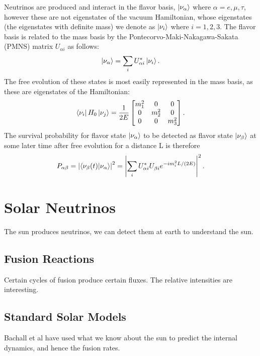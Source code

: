 Neutrinos are produced and interact in the flavor basis, $\ket{\nu_{\alpha}}$ where $\alpha = {e,\mu,\tau}$, however these are not eigenstates of the vacuum Hamiltonian, whose eigenstates (the eigenstates with definite mass) we denote as $\ket{\nu_i}$ where $i = {1,2,3}$. 
The flavor basis is related to the mass basis by the Pontecorvo-Maki-Nakagawa-Sakata (PMNS) matrix $U_{\alpha i}$ as follows:
\begin{equation}
\ket{\nu_{\alpha}} = \sum_i U^*_{\alpha i} \ket{\nu_i}.
\end{equation}
The free evolution of these states is most easily represented in the mass basis, as these are eigenstates of the Hamiltonian:
\begin{equation}
\bra{\nu_i}H_{0}\ket{\nu_j} = \frac{1}{2E}\begin{bmatrix}
m_1^2 & 0 & 0 \\
0 & m_2^2 & 0 \\
0 & 0 & m_3^2
\end{bmatrix}.
\end{equation}
The survival probability for flavor state $\ket{\nu_\alpha}$ to be detected as flavor state $\ket{\nu_\beta}$ at some later time after free evolution for a distance L is therefore
\begin{equation}
P_{\alpha\beta} = \left|\braket{\nu_\beta(t)}{\nu_\alpha}\right|^2 = \left|\sum_i U^*_{\alpha i} U^{}_{\beta i} e^{- i m_i^2 L/(2E)} \right|^2.
\end{equation}

\section{Solar Neutrinos}

The sun produces neutrinos, we can detect them at earth to understand the sun.

\subsection{Fusion Reactions}

Certain cycles of fusion produce certain fluxes. The relative intensities are interesting.

\subsection{Standard Solar Models}

Bachall et al have used what we know about the sun to predict the internal dynamics, and hence the fusion rates.

